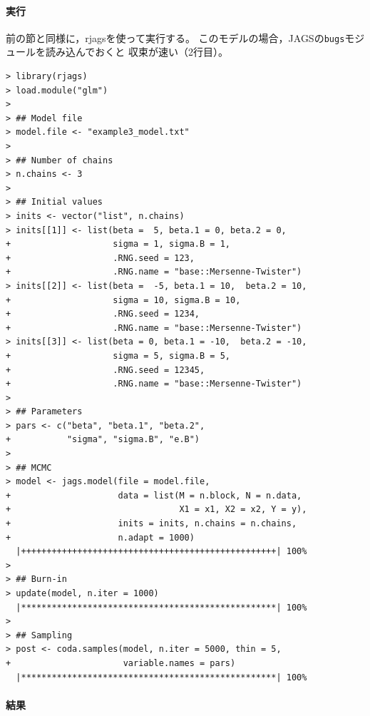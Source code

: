 \documentclass[11pt,uplatex]{jsarticle}
\begin{document}

\paragraph{実行}

前の節と同様に，\textsf{rjags}を使って実行する。
このモデルの場合，\textsf{JAGS}の\texttt{bugs}モジュールを読み込んでおくと
収束が速い（2行目）。

\begin{lstlisting}
> library(rjags)
> load.module("glm")
>
> ## Model file
> model.file <- "example3_model.txt"
> 
> ## Number of chains
> n.chains <- 3
> 
> ## Initial values
> inits <- vector("list", n.chains)
> inits[[1]] <- list(beta =  5, beta.1 = 0, beta.2 = 0,
+                    sigma = 1, sigma.B = 1,
+                    .RNG.seed = 123,
+                    .RNG.name = "base::Mersenne-Twister")
> inits[[2]] <- list(beta =  -5, beta.1 = 10,  beta.2 = 10,
+                    sigma = 10, sigma.B = 10,
+                    .RNG.seed = 1234,
+                    .RNG.name = "base::Mersenne-Twister")
> inits[[3]] <- list(beta = 0, beta.1 = -10,  beta.2 = -10,
+                    sigma = 5, sigma.B = 5,
+                    .RNG.seed = 12345,
+                    .RNG.name = "base::Mersenne-Twister")
> 
> ## Parameters
> pars <- c("beta", "beta.1", "beta.2",
+           "sigma", "sigma.B", "e.B")
> 
> ## MCMC
> model <- jags.model(file = model.file,
+                     data = list(M = n.block, N = n.data,
+                                 X1 = x1, X2 = x2, Y = y),
+                     inits = inits, n.chains = n.chains,
+                     n.adapt = 1000)
  |++++++++++++++++++++++++++++++++++++++++++++++++++| 100%
>
> ## Burn-in
> update(model, n.iter = 1000)
  |**************************************************| 100%
> 
> ## Sampling
> post <- coda.samples(model, n.iter = 5000, thin = 5,
+                      variable.names = pars)
  |**************************************************| 100%
\end{lstlisting}

\paragraph{結果}
\end{document}
